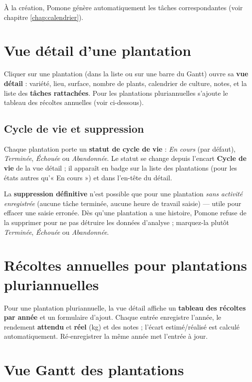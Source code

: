 À la création, Pomone génère automatiquement les tâches correspondantes (voir chapitre \ref{chap:calendrier}).

\section{Vue détail d'une plantation}

Cliquer sur une plantation (dans la liste ou sur une barre du Gantt) ouvre sa \textbf{vue détail} : variété, lieu, surface, nombre de plants, calendrier de culture, notes, et la liste des \textbf{tâches rattachées}. Pour les plantations pluriannuelles s'ajoute le tableau des récoltes annuelles (voir ci-dessous).

\subsection{Cycle de vie et suppression}
\label{sec:cycle-vie-plantation}

Chaque plantation porte un \textbf{statut de cycle de vie} : \emph{En cours} (par défaut), \emph{Terminée}, \emph{Échouée} ou \emph{Abandonnée}. Le statut se change depuis l'encart \textbf{Cycle de vie} de la vue détail ; il apparaît en badge sur la liste des plantations (pour les états autres qu'« En cours ») et dans l'en-tête du détail.

La \textbf{suppression définitive} n'est possible que pour une plantation \emph{sans activité enregistrée} (aucune tâche terminée, aucune heure de travail saisie) — utile pour effacer une saisie erronée. Dès qu'une plantation a une histoire, Pomone refuse de la supprimer pour ne pas détruire les données d'analyse ; marquez-la plutôt \emph{Terminée}, \emph{Échouée} ou \emph{Abandonnée}.

\section{Récoltes annuelles pour plantations pluriannuelles}

Pour une plantation pluriannuelle, la vue détail affiche un \textbf{tableau des récoltes par année} et un formulaire d'ajout. Chaque entrée enregistre l'année, le rendement \textbf{attendu} et \textbf{réel} (kg) et des notes ; l'écart estimé/réalisé est calculé automatiquement. Ré-enregistrer la même année met l'entrée à jour.

\section{Vue Gantt des plantations}

